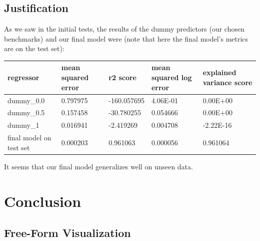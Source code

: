 \documentclass{article}
\begin{document}
\subsection{Justification}

As we saw in the initial tests, the results of the dummy predictors (our chosen benchmarks) and our final model were (note that here the final model's metrics are on the test set):

\begin{center}
\begin{tabular}{ |l|l|l|l|l| }
  \hline
  regressor & mean squared error & r2 score & mean squared log error & explained variance score\\
  \hline
  dummy\_0.0 & 0.797975 & -160.057695 & 4.06E-01 & 0.00E+00\\
  dummy\_0.5 & 0.157458 & -30.780255 & 0.054666 & 0.00E+00\\
  dummy\_1 & 0.016941 & -2.419269 & 0.004708 & -2.22E-16\\
  final model on test set & 0.000203 & 0.961063 & 0.000056 & 0.961064\\
  \hline
\end{tabular}
\end{center}

It seems that our final model generalizes well on unseen data.

\section{Conclusion}
\subsection{Free-Form Visualization}
\end{document}
